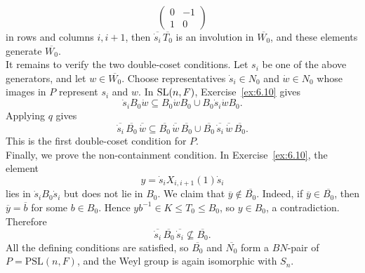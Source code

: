 \documentclass[../Odyssey_Project.tex]{subfiles}
\begin{document}
\begin{solution}
\[
    \begin{pmatrix}
        0&-1\\
        1&0
    \end{pmatrix}
\]
in rows and columns $i,i+1$, then $\overline{\dot{s}_i}\,\overline{T_0}$ is an involution in $\overline{W_0}$, and these elements generate $\overline{W_0}$.\\
It remains to verify the two double-coset conditions. Let $s_i$ be one of the above generators, and let $w\in\overline{W_0}$. Choose representatives $\dot{s}_i\in N_0$ and $\dot{w}\in N_0$ whose images in $P$ represent $s_i$ and $w$. In $\operatorname{SL}(n,F)$, Exercise~\ref{ex:6.10} gives
\[
    \dot{s}_iB_0\dot{w}
    \subseteq
    B_0\dot{w}B_0\cup B_0\dot{s}_i\dot{w}B_0.
\]
Applying $q$ gives
\[
    \overline{\dot{s}_i}\,\overline{B_0}\,\overline{\dot{w}}
    \subseteq
    \overline{B_0}\,\overline{\dot{w}}\,\overline{B_0}
    \cup
    \overline{B_0}\,\overline{\dot{s}_i}\,\overline{\dot{w}}\,\overline{B_0}.
\]
This is the first double-coset condition for $P$.\\
Finally, we prove the non-containment condition. In Exercise~\ref{ex:6.10}, the element
\[
    y=\dot{s}_iX_{i,i+1}(1)\dot{s}_i
\]
lies in $\dot{s}_iB_0\dot{s}_i$ but does not lie in $B_0$. We claim that $\overline{y}\notin\overline{B_0}$. Indeed, if $\overline{y}\in\overline{B_0}$, then $\overline{y}=\overline{b}$ for some $b\in B_0$. Hence $yb^{-1}\in K\leq T_0\leq B_0$, so $y\in B_0$, a contradiction. Therefore
\[
    \overline{\dot{s}_i}\,\overline{B_0}\,\overline{\dot{s}_i}
    \nsubseteq
    \overline{B_0}.
\]
All the defining conditions are satisfied, so $\overline{B_0}$ and $\overline{N_0}$ form a $BN$-pair of $P=\mathrm{PSL}(n,F)$, and the Weyl group is again isomorphic with $S_n$.
\end{solution}
\end{document}
